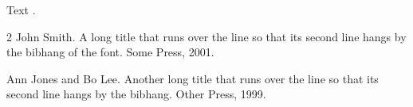 \documentclass{article}
\begin{document}
Text \citep{a}.

\begin{thebibliography}{2}
John Smith.
\newblock A long title that runs over the line so that its second line hangs by the bibhang of the font.
\newblock Some Press, 2001.

Ann Jones and Bo Lee.
\newblock Another long title that runs over the line so that its second line hangs by the bibhang.
\newblock Other Press, 1999.
\end{thebibliography}
\end{document}
